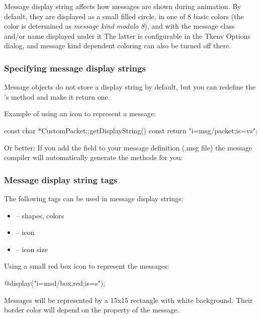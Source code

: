 Message display string affects how messages are shown during animation.
By default, they are displayed as a small filled circle, in one of
8 basic colors (the color is determined as \textit{message kind modulo 8}),
and with the message class and/or name displayed under it
The latter is configurable in the Tkenv Options dialog, and message kind
dependent coloring can also be turned off there.

\subsubsection{Specifying message display strings}
Message objects do not store a display string by default, but you can redefine
the 's  method and make it return
one.

Example of using an icon to represent a message:

\begin{cpp}
const char *CustomPacket::getDisplayString() const
{
    return "i=msg/packet;is=vs";
}
\end{cpp}

Or better: If you add the field  to your message
definition (.msg file) the message compiler will automatically generate
the  methods for you:

\begin{msg}
message Job
{
    string displayString = "i=msg/package_s,kind";
...
\end{msg}

\subsubsection{Message display string tags}

The following tags can be used in message display strings:
\begin{itemize}
  \item{ -- shapes, colors}
  \item{ -- icon}
  \item{ -- icon size}
\end{itemize}

Using a small red box icon to represent the messages:

\begin{ned}
@display("i=msd/box,red;is=s");
\end{ned}

Messages will be represented by a 15x15 rectangle with white background.
Their border color will depend on the  property of the message.


